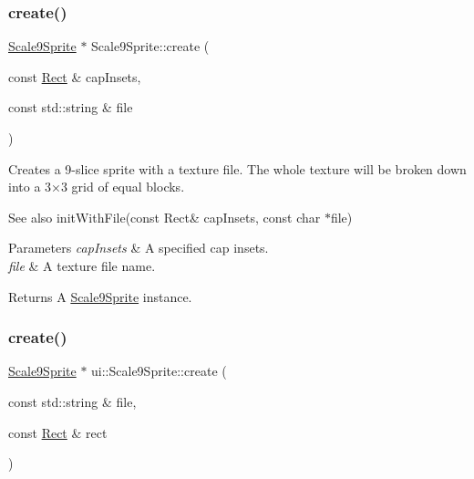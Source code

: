 \subsubsection{\texorpdfstring{create()}{create()}\hspace{0.1cm}{\footnotesize\ttfamily [6/10]}}
{\footnotesize\ttfamily \hyperlink{classui_1_1Scale9Sprite}{Scale9\+Sprite} $\ast$ Scale9\+Sprite\+::create (\begin{DoxyParamCaption}\item[{const \hyperlink{classRect}{Rect} \&}]{cap\+Insets,  }\item[{const std\+::string \&}]{file }\end{DoxyParamCaption})\hspace{0.3cm}{\ttfamily [static]}}

Creates a 9-\/slice sprite with a texture file. The whole texture will be broken down into a 3×3 grid of equal blocks.

\begin{DoxySeeAlso}{See also}
init\+With\+File(const Rect\& cap\+Insets, const char $\ast$file) 
\end{DoxySeeAlso}

\begin{DoxyParams}{Parameters}
{\em cap\+Insets} & A specified cap insets. \\
\hline
{\em file} & A texture file name. \\
\hline
\end{DoxyParams}
\begin{DoxyReturn}{Returns}
A \hyperlink{classui_1_1Scale9Sprite}{Scale9\+Sprite} instance. 
\end{DoxyReturn}
\mbox{\label{classui_1_1Scale9Sprite_a0e57d4efd50b2df135a40e7d83de2f1a}} 
\subsubsection{\texorpdfstring{create()}{create()}\hspace{0.1cm}{\footnotesize\ttfamily [7/10]}}
{\footnotesize\ttfamily \hyperlink{classui_1_1Scale9Sprite}{Scale9\+Sprite} $\ast$ ui\+::\+Scale9\+Sprite\+::create (\begin{DoxyParamCaption}\item[{const std\+::string \&}]{file,  }\item[{const \hyperlink{classRect}{Rect} \&}]{rect }\end{DoxyParamCaption})\hspace{0.3cm}{\ttfamily [static]}}

